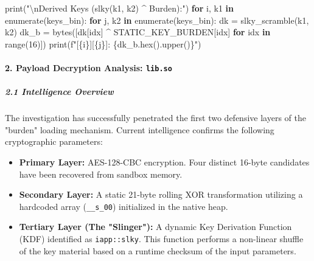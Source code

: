 \documentclass[
]{article}
\newenvironment{Shaded}{}{}
\newcommand{\BuiltInTok}[1]{\textcolor[rgb]{0.00,0.50,0.00}{#1}}
\newcommand{\CharTok}[1]{\textcolor[rgb]{0.25,0.44,0.63}{#1}}
\newcommand{\ControlFlowTok}[1]{\textcolor[rgb]{0.00,0.44,0.13}{\textbf{#1}}}
\newcommand{\DecValTok}[1]{\textcolor[rgb]{0.25,0.63,0.44}{#1}}
\newcommand{\KeywordTok}[1]{\textcolor[rgb]{0.00,0.44,0.13}{\textbf{#1}}}
\newcommand{\NormalTok}[1]{#1}
\newcommand{\OperatorTok}[1]{\textcolor[rgb]{0.40,0.40,0.40}{#1}}
\newcommand{\SpecialCharTok}[1]{\textcolor[rgb]{0.25,0.44,0.63}{#1}}
\newcommand{\SpecialStringTok}[1]{\textcolor[rgb]{0.73,0.40,0.53}{#1}}
\newcommand{\StringTok}[1]{\textcolor[rgb]{0.25,0.44,0.63}{#1}}
\begin{document}
\begin{Shaded}
\begin{Highlighting}[]
\BuiltInTok{print}\NormalTok{(}\StringTok{"}\CharTok{\textbackslash{}n}\StringTok{Derived Keys (slky(k1, k2) \^{} Burden):"}\NormalTok{)}
\ControlFlowTok{for}\NormalTok{ i, k1 }\KeywordTok{in} \BuiltInTok{enumerate}\NormalTok{(keys\_bin):}
    \ControlFlowTok{for}\NormalTok{ j, k2 }\KeywordTok{in} \BuiltInTok{enumerate}\NormalTok{(keys\_bin):}
\NormalTok{        dk }\OperatorTok{=}\NormalTok{ slky\_scramble(k1, k2)}
\NormalTok{        dk\_b }\OperatorTok{=} \BuiltInTok{bytes}\NormalTok{([dk[idx] }\OperatorTok{\^{}}\NormalTok{ STATIC\_KEY\_BURDEN[idx] }\ControlFlowTok{for}\NormalTok{ idx }\KeywordTok{in} \BuiltInTok{range}\NormalTok{(}\DecValTok{16}\NormalTok{)])}
        \BuiltInTok{print}\NormalTok{(}\SpecialStringTok{f"[}\SpecialCharTok{\{}\NormalTok{i}\SpecialCharTok{\}}\SpecialStringTok{][}\SpecialCharTok{\{}\NormalTok{j}\SpecialCharTok{\}}\SpecialStringTok{]: }\SpecialCharTok{\{}\NormalTok{dk\_b}\SpecialCharTok{.}\BuiltInTok{hex}\NormalTok{()}\SpecialCharTok{.}\NormalTok{upper()}\SpecialCharTok{\}}\SpecialStringTok{"}\NormalTok{)}
\end{Highlighting}
\end{Shaded}

\paragraph{\texorpdfstring{2. Payload Decryption Analysis:
\texttt{lib.so}}{2. Payload Decryption Analysis: lib.so}}\label{2-payload-decryption-analysis-libso}

\subparagraph{2.1 Intelligence Overview}\label{21-intelligence-overview}

The investigation has successfully penetrated the first two defensive
layers of the "burden" loading mechanism. Current intelligence confirms
the following cryptographic parameters:

\begin{itemize}
\item
  \textbf{Primary Layer:} AES-128-CBC encryption. Four distinct 16-byte
  candidates have been recovered from sandbox memory.
\item
  \textbf{Secondary Layer:} A static 21-byte rolling XOR transformation
  utilizing a hardcoded array (\texttt{\_\_s\_00}) initialized in the
  native heap.
\item
  \textbf{Tertiary Layer (The "Slinger"):} A dynamic Key Derivation
  Function (KDF) identified as \texttt{iapp::slky}. This function
  performs a non-linear shuffle of the key material based on a runtime
  checksum of the input parameters.
\end{itemize}
\end{document}
